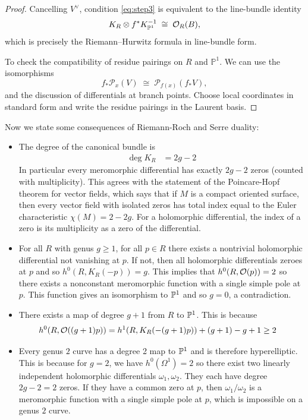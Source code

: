 \documentclass[12pt]{article}
\begin{document}
\begin{proof}
Cancelling $V^\vee$, condition \eqref{eq:step3} is equivalent to the line-bundle identity
\begin{equation}\label{eq:RH}
  K_R\otimes f^*K_{\P^1}^{-1}
  \;\cong\;
  \cO_R(B),
\end{equation}
which is precisely the Riemann--Hurwitz formula in line-bundle form.

To check the compatibility of residue pairings on $R$ and $\mathbb{P}^1$. We can use the isomorphisms
\[
f_*\mathcal{P}_x(V) \;\cong\; \mathcal{P}_{f(x)}(f_*V),
\]
and the discussion of differentials at branch points. Choose local coordinates in standard
form and write the residue pairings in the Laurent basis.
\end{proof} 


Now we state some consequences of Riemann-Roch and Serre duality:
\begin{itemize}
    \item The degree of the canonical bundle is \begin{align*}
        \deg K_R & = 2g - 2
    \end{align*} In particular every meromorphic differential has exactly $2g-2$ zeros (counted with multiplicity). This agrees with the statement of the Poincare-Hopf theorem for vector fields, which says that if $M$ is a compact oriented surface, then every vector field with isolated zeros has total index equal to the Euler characteristic $\chi(M) = 2-2g$. For a holomorphic differential, the index of a zero is its multiplicity as a zero of the differential.
    \item For all $R$ with genus $g \geq 1$, for all $p\in R$ there exists a nontrivial holomorphic differential not vanishing at $p$. If not, then all holomorphic differentials zeroes at $p$ and so $h^0(R, K_R(-p)) = g$. This implies that $h^0(R,\cO(p)) = 2$ so there exists a nonconstant meromorphic function with a single simple pole at $p$. This function gives an isomorphism to $\P^1$ and so $g=0$, a contradiction.
    \item There exists a map of degree $g+1$ from $R$ to $\P^1$. This is because \begin{align*}
        h^0(R, \cO((g+1)p)) &= h^1(R, K_R(- (g+1)p)) + (g+1) - g + 1 \geq 2 
    \end{align*}
    \item Every genus $2$ curve has a degree 2 map to $\P^1$ and is therefore hyperelliptic. This is because for $g=2$, we have $h^0(\Omega^1) = 2$ so there exist two linearly independent holomorphic differentials $\omega_1, \omega_2$. They each have degree $2g-2 = 2$ zeros. If they have a common zero at $p$, then $\omega_1/\omega_2$ is a meromorphic function with a single simple pole at $p$, which is impossible on a genus $2$ curve. 
\end{itemize}
\end{document}
